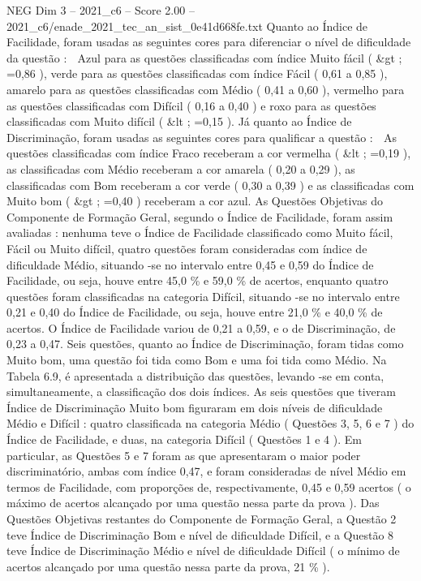 \begin{textsample}{NEG Dim 3 – 2021\_c6 – Score 2.00 – 2021\_c6/enade\_2021\_tec\_an\_sist\_0e41d668fe.txt}
Quanto ao Índice de Facilidade, foram usadas as seguintes cores para diferenciar o nível de dificuldade da questão :  Azul para as questões classificadas com índice Muito fácil ( \&gt ; =0,86 ), verde para as questões classificadas com índice Fácil ( 0,61 a 0,85 ), amarelo para as questões classificadas com Médio ( 0,41 a 0,60 ), vermelho para as questões classificadas com Difícil ( 0,16 a 0,40 ) e roxo para as questões classificadas com Muito difícil ( \&lt ; =0,15 ).
Já quanto ao Índice de Discriminação, foram usadas as seguintes cores para qualificar a questão :  As questões classificadas com índice Fraco receberam a cor vermelha ( \&lt ; =0,19 ), as classificadas com Médio receberam a cor amarela ( 0,20 a 0,29 ), as classificadas com Bom receberam a cor verde ( 0,30 a 0,39 ) e as classificadas com Muito bom ( \&gt ; =0,40 ) receberam a cor azul.
As Questões Objetivas do Componente de Formação Geral, segundo o Índice de Facilidade, foram assim avaliadas : nenhuma teve o Índice de Facilidade classificado como Muito fácil, Fácil ou Muito difícil, quatro questões foram consideradas com índice de dificuldade Médio, situando -se no intervalo entre 0,45 e 0,59 do Índice de Facilidade, ou seja, houve entre 45,0 \% e 59,0 \% de acertos, enquanto quatro questões foram classificadas na categoria Difícil, situando -se no intervalo entre 0,21 e 0,40 do Índice de Facilidade, ou seja, houve entre 21,0 \% e 40,0 \% de acertos.
O Índice de Facilidade variou de 0,21 a 0,59, e o de Discriminação, de 0,23 a 0,47.
Seis questões, quanto ao Índice de Discriminação, foram tidas como Muito bom, uma questão foi tida como Bom e uma foi tida como Médio.
Na Tabela 6.9, é apresentada a distribuição das questões, levando -se em conta, simultaneamente, a classificação dos dois índices.
As seis questões que tiveram Índice de Discriminação Muito bom figuraram em dois níveis de dificuldade Médio e Difícil : quatro classificada na categoria Médio ( Questões 3, 5, 6 e 7 ) do Índice de Facilidade, e duas, na categoria Difícil ( Questões 1 e 4 ).
Em particular, as Questões 5 e 7 foram as que apresentaram o maior poder discriminatório, ambas com índice 0,47, e foram consideradas de nível Médio em termos de Facilidade, com proporções de, respectivamente, 0,45 e 0,59 acertos ( o máximo de acertos alcançado por uma questão nessa parte da prova ).
Das Questões Objetivas restantes do Componente de Formação Geral, a Questão 2 teve Índice de Discriminação Bom e nível de dificuldade Difícil, e a Questão 8 teve Índice de Discriminação Médio e nível de dificuldade Difícil ( o mínimo de acertos alcançado por uma questão nessa parte da prova, 21 \% ).

\end{textsample}
